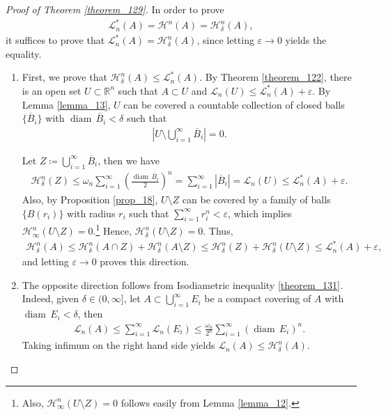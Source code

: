 \documentclass[11pt]{book}
\theoremstyle{definition}
\numberwithin{equation}{chapter}
\def\H{{\mathcal H}}
\def\L{{\mathcal L}}
\def\diam{{\operatorname{diam}\,}}
\begin{document}
\medskip

\begin{proof}[Proof of Theorem \ref{theorem_129}]
In order to prove 
\begin{align*}
    \L_n^*(A) = \H^n(A) = \H^n_{\delta} (A),
\end{align*}
it suffices to prove that $\L_n^*(A) = \H^n_{\delta} (A)$, since letting $\varepsilon \to 0$ yields the equality. 
\begin{enumerate}[label=(\alph*)]
    \item First, we prove that $\H^n_{\delta} (A) \leq \L_n^*(A)$. By Theorem \ref{theorem_122}, there is an open set $U \subset \mathbb{R}^n$ such that $A \subset U$ and $\L_n(U) \leq \L_n^*(A) + \varepsilon$. By Lemma \ref{lemma_13}, $U$ can be covered a countable collection of closed balls $\{\overline{B}_i\}$ with $\diam \overline{B}_i < \delta$ such that 
    \begin{align*}
        \left|U \setminus \bigcup^\infty_{i=1} \overline{B}_i\right| = 0.
    \end{align*}
    
    Let $Z \coloneqq \bigcup^\infty_{i=1} \overline{B}_i$, then we have
    \begin{align*}
        \H^n_{\delta}(Z) \leq \omega_n \sum^\infty_{i=1} \left(\frac{\diam \overline{B}_i}{2}\right)^n = \sum^\infty_{i=1} \left|\overline{B}_i\right| = \L_n(U) \leq \L_n^*(A) + \varepsilon.
    \end{align*}
    Also, by Proposition \ref{prop_18}, $U\setminus Z$ can be covered by a family of balls $\{B(r_i)\}$ with radius $r_i$ such that $\sum^\infty_{i=1} r_i^n < \varepsilon$, which implies $\H^n_{\infty}(U\setminus Z) = 0$.\footnote{Also, $\H^n_{\infty}(U\setminus Z) = 0$ follows easily from Lemma \ref{lemma_12}.} Hence, $\H^n_{\delta}(U\setminus Z) = 0$. Thus,
    \begin{align*}
        \H^n_{\delta}(A) \leq \H^n_{\delta}(A \cap Z) + \H^n_{\delta}(A \setminus Z) \leq \H^n_{\delta}(Z) + \H^n_{\delta}(U \setminus Z) \leq \L_n^*(A) + \varepsilon,
    \end{align*}
    and letting $\varepsilon \to 0$ proves this direction.
    
    \item The opposite direction follows from Isodiametric inequality \ref{theorem_131}. Indeed, given $\delta \in (0,\infty]$, let $A \subset \bigcup^\infty_{i=1} E_i$ be a compact covering of $A$ with $\diam E_i < \delta$, then
    \begin{align*}
        \L_n(A) \leq \sum^\infty_{i=1} \L_n(E_i) \leq \frac{\omega_n}{2^n} \sum^\infty_{i=1} (\diam E_i)^n.
    \end{align*}
    Taking infimum on the right hand side yields $\L_n(A) \leq \H^n_{\delta}(A)$.
\end{enumerate}
\end{proof}
\end{document}

